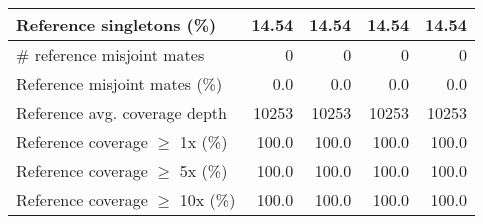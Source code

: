 \documentclass[12pt,a4paper]{article}
\begin{document}
\begin{table}[ht]
\begin{center}
\begin{tabular}{|l*{4}{|r}|}
Reference singletons (\%) & 14.54 & 14.54 & 14.54 & 14.54 \\ \hline
\# reference misjoint mates & 0 & 0 & 0 & 0 \\ \hline
Reference misjoint mates (\%) & 0.0 & 0.0 & 0.0 & 0.0 \\ \hline
Reference avg. coverage depth & 10253 & 10253 & 10253 & 10253 \\ \hline
Reference coverage $\geq$ 1x (\%) & 100.0 & 100.0 & 100.0 & 100.0 \\ \hline
Reference coverage $\geq$ 5x (\%) & 100.0 & 100.0 & 100.0 & 100.0 \\ \hline
Reference coverage $\geq$ 10x (\%) & 100.0 & 100.0 & 100.0 & 100.0 \\ \hline
\end{tabular}
\end{center}
\end{table}
\end{document}
